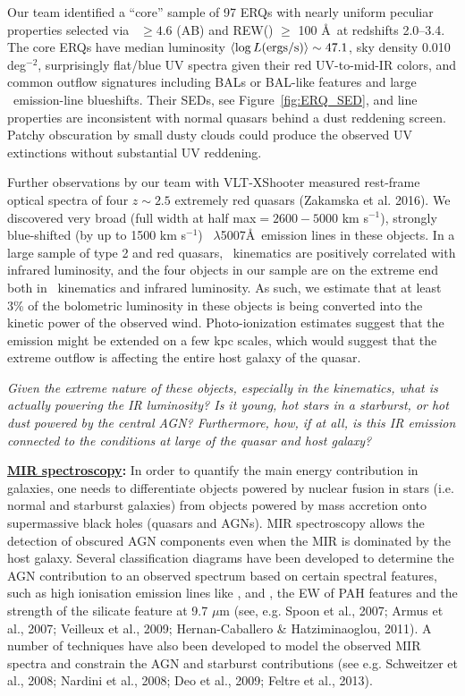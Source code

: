 \smallskip
\smallskip
\noindent
Our team identified a ``core'' sample of 97 ERQs with nearly uniform
peculiar properties selected via \imw\ $\ge 4.6$ (AB) and REW(\civ )
$\ge$ 100 \AA\ at redshifts 2.0--3.4.  The core ERQs have median
luminosity $\left<\log L ({\rm ergs/s})\right> \sim 47.1$, sky density
0.010 deg$^{-2}$, surprisingly flat/blue UV spectra given their red
UV-to-mid-IR colors, and common outflow signatures including BALs or
BAL-like features and large \civ\ emission-line blueshifts. Their
SEDs, see Figure~\ref{fig:ERQ_SED}, and line properties are
inconsistent with normal quasars behind a dust reddening
screen. Patchy obscuration by small dusty clouds could produce the
observed UV extinctions without substantial UV reddening.


\smallskip
\smallskip
\noindent
Further observations by our team with VLT-XShooter measured rest-frame
optical spectra of four $z\sim 2.5$ extremely red quasars (Zakamska et al. 2016).  
We discovered very broad (full width at half max$= 2600-5000$ km
s$^{-1}$), strongly blue-shifted (by up to 1500 km s$^{-1}$)
\oiii\ $\lambda$5007\AA\ emission lines in these objects. In a large
sample of type 2 and red quasars, \oiii\ kinematics are positively
correlated with infrared luminosity, and the four objects in our
sample are on the extreme end both in \oiii\ kinematics and infrared
luminosity.
As such, we estimate that at least 3\% of the bolometric luminosity in
these objects is being converted into the kinetic power of the
observed wind. Photo-ionization estimates suggest that the \oiii
emission might be extended on a few kpc scales, which would suggest
that the extreme outflow is affecting the entire host galaxy of the
quasar.

\smallskip
\smallskip
\noindent
{\it Given the extreme nature of these objects, especially in the 
kinematics,  what is actually powering the IR luminosity? 
Is it young, hot stars in a starburst, or hot dust powered by the central AGN?
Furthermore, how, if at all, is this IR emission connected to the
conditions at large of the quasar and host galaxy?}


\medskip
\medskip
\smallskip
\smallskip
\noindent
{\bf \underline{MIR spectroscopy}:}
In order to quantify the main energy contribution in galaxies, one
needs to differentiate objects powered by nuclear fusion in stars
(i.e. normal and starburst galaxies) from objects powered by mass
accretion onto supermassive black holes (quasars and AGNs). 
MIR spectroscopy allows the detection of obscured AGN components even
when the MIR is dominated by the host galaxy. Several classification
diagrams have been developed to determine the AGN contribution to an
observed spectrum based on certain spectral features, such as high
ionisation emission lines like \nev, \neii and \oiv, the EW of PAH
features and the strength of the silicate feature at 9.7 $\mu$m (see,
e.g. Spoon et al., 2007; Armus et al., 2007; Veilleux et al., 2009;
Hernan-Caballero \& Hatziminaoglou, 2011). A number of techniques have
also been developed to model the observed MIR spectra and constrain
the AGN and starburst contributions (see e.g. Schweitzer et al., 2008;
Nardini et al., 2008; Deo et al., 2009; Feltre et al., 2013).

